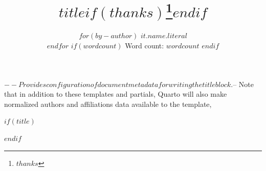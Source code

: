 $-- Provides configuration of document metadata for writing the title block.
$-- Note that in addition to these templates and partials, Quarto will also make normalized authors and affiliations data available to the template,

\usepackage{titling}
\setlength{\droptitle}{-1.5cm}

$if(title)$
\title{$title$$if(thanks)$\thanks{$thanks$}$endif$}
$endif$

\author{
$for(by-author)$
{\bfseries \normalsize $it.name.literal$}\\%
\vspace{10pt}%
$endfor$
$if(wordcount)$
{\footnotesize Word count: $wordcount$}
$endif$
}

\predate{}
\postdate{}
\date{}
